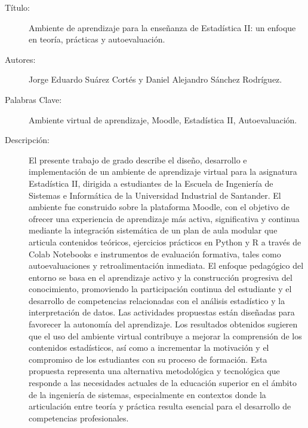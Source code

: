 \documentclass[letter,oneside,12pt,spanish]{report}
\begin{document}
\footnotesize{
\begin{description}
  \item[Título:] Ambiente de aprendizaje para la enseñanza de Estadística II: un enfoque en teoría, prácticas y autoevaluación.
  \item[Autores:] Jorge Eduardo Suárez Cortés y Daniel Alejandro Sánchez Rodríguez.
  \item[Palabras Clave:]Ambiente virtual de aprendizaje, Moodle, Estadística II, Autoevaluación.
  \item[Descripción:] El presente trabajo de grado describe el diseño, desarrollo e implementación de un ambiente de aprendizaje virtual para la asignatura Estadística II, dirigida a estudiantes de la Escuela de Ingeniería de Sistemas e Informática de la Universidad Industrial de Santander. El ambiente fue construido sobre la plataforma Moodle, con el objetivo de ofrecer una experiencia de aprendizaje más activa, significativa y continua mediante la integración sistemática de un plan de aula modular que articula contenidos teóricos, ejercicios prácticos en Python y R a través de Colab Notebooks e instrumentos de evaluación formativa, tales como autoevaluaciones y retroalimentación inmediata.
  El enfoque pedagógico del entorno se basa en el aprendizaje activo y la construcción progresiva del conocimiento, promoviendo la participación continua del estudiante y el desarrollo de competencias relacionadas con el análisis estadístico y la interpretación de datos. Las actividades propuestas están diseñadas para favorecer la autonomía del aprendizaje. Los resultados obtenidos sugieren que el uso del ambiente virtual contribuye a mejorar la comprensión de los contenidos estadísticos, así como a incrementar la motivación y el compromiso de los estudiantes con su proceso de formación. Esta propuesta representa una alternativa metodológica y tecnológica que responde a las necesidades actuales de la educación superior en el ámbito de la ingeniería de sistemas, especialmente en contextos donde la articulación entre teoría y práctica resulta esencial para el desarrollo de competencias profesionales.
  
  
\end{description}}\normalsize

\end{document}
